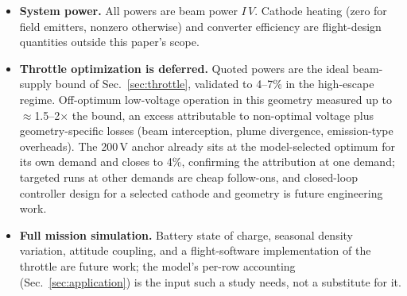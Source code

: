 \documentclass[11pt]{article}
\begin{document}
\begin{itemize}
        $r_g \approx 1.4$\,m against a 30\,mm domain -- cannot be posed
        in RZ and is the largest unexamined question.
  \item \textbf{System power.} All powers are beam power $I\,V$. Cathode
        heating (zero for field emitters, nonzero otherwise) and converter
        efficiency are flight-design quantities outside this paper's scope.
  \item \textbf{Throttle optimization is deferred.} Quoted powers are the
        ideal beam-supply bound of Sec.~\ref{sec:throttle}, validated to
        4--7\% in the high-escape regime. Off-optimum low-voltage
        operation in this geometry measured up to
        $\approx$1.5--2$\times$ the bound, an excess attributable to
        non-optimal voltage plus geometry-specific losses (beam
        interception, plume divergence, emission-type overheads). The
        200\,V anchor already sits at the model-selected optimum for its
        own demand and closes to 4\%, confirming the attribution at one
        demand; targeted runs at other demands are cheap follow-ons, and
        closed-loop controller design for a selected cathode and geometry
        is future engineering work.
  \item \textbf{Full mission simulation.} Battery state of charge, seasonal
        density variation, attitude coupling, and a flight-software
        implementation of the throttle are future work; the model's per-row
        accounting (Sec.~\ref{sec:application}) is the input such a study
        needs, not a substitute for it.
\end{itemize}
\end{document}
